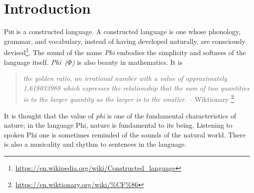 \section{Introduction}
\textsc{Phi} is a constructed language. A constructed language is one whose phonology, grammar, and vocabulary, instead of having developed naturally, are consciously devised\footnote{\hspace{0.1em}\url{https://en.wikipedia.org/wiki/Constructed\_language}}. The sound of the name \emph{Phi} embodies the simplicity and softness of the language itself. \emph{Phi~($\varPhi$)} is also beauty in mathematics. It is

\begin{quote}
  \emph{the golden ratio, an irrational number with a value of approximately 1.618033988 which expresses the relationship that the sum of two quantities is to the larger quantity as the larger is to the smaller.} -- Wiktionary \footnote{\hspace{0.1em}\url{https://en.wiktionary.org/wiki/\%CF\%86}}
\end{quote}

It is thought that the value of \emph{phi} is one of the fundamental characteristics of nature; in the language Phi, nature is fundamental to its being. Listening to spoken Phi one is sometimes reminded of the sounds of the natural world. There is also a musicality and rhythm to sentences in the language.
